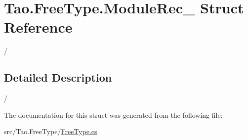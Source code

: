 \hypertarget{struct_tao_1_1_free_type_1_1_module_rec__}{
\section{Tao.FreeType.ModuleRec\_\- Struct Reference}
\label{struct_tao_1_1_free_type_1_1_module_rec__}
}


/  




\subsection{Detailed Description}
/ 

The documentation for this struct was generated from the following file:\begin{DoxyCompactItemize}
\item 
src/Tao.FreeType/\hyperlink{_free_type_8cs}{FreeType.cs}\end{DoxyCompactItemize}
